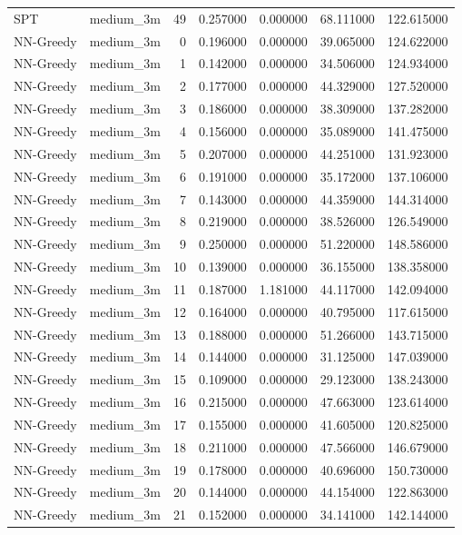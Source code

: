 \begin{tabular}{llrrrrr}
SPT & medium_3m & 49 & 0.257000 & 0.000000 & 68.111000 & 122.615000 \\
NN-Greedy & medium_3m & 0 & 0.196000 & 0.000000 & 39.065000 & 124.622000 \\
NN-Greedy & medium_3m & 1 & 0.142000 & 0.000000 & 34.506000 & 124.934000 \\
NN-Greedy & medium_3m & 2 & 0.177000 & 0.000000 & 44.329000 & 127.520000 \\
NN-Greedy & medium_3m & 3 & 0.186000 & 0.000000 & 38.309000 & 137.282000 \\
NN-Greedy & medium_3m & 4 & 0.156000 & 0.000000 & 35.089000 & 141.475000 \\
NN-Greedy & medium_3m & 5 & 0.207000 & 0.000000 & 44.251000 & 131.923000 \\
NN-Greedy & medium_3m & 6 & 0.191000 & 0.000000 & 35.172000 & 137.106000 \\
NN-Greedy & medium_3m & 7 & 0.143000 & 0.000000 & 44.359000 & 144.314000 \\
NN-Greedy & medium_3m & 8 & 0.219000 & 0.000000 & 38.526000 & 126.549000 \\
NN-Greedy & medium_3m & 9 & 0.250000 & 0.000000 & 51.220000 & 148.586000 \\
NN-Greedy & medium_3m & 10 & 0.139000 & 0.000000 & 36.155000 & 138.358000 \\
NN-Greedy & medium_3m & 11 & 0.187000 & 1.181000 & 44.117000 & 142.094000 \\
NN-Greedy & medium_3m & 12 & 0.164000 & 0.000000 & 40.795000 & 117.615000 \\
NN-Greedy & medium_3m & 13 & 0.188000 & 0.000000 & 51.266000 & 143.715000 \\
NN-Greedy & medium_3m & 14 & 0.144000 & 0.000000 & 31.125000 & 147.039000 \\
NN-Greedy & medium_3m & 15 & 0.109000 & 0.000000 & 29.123000 & 138.243000 \\
NN-Greedy & medium_3m & 16 & 0.215000 & 0.000000 & 47.663000 & 123.614000 \\
NN-Greedy & medium_3m & 17 & 0.155000 & 0.000000 & 41.605000 & 120.825000 \\
NN-Greedy & medium_3m & 18 & 0.211000 & 0.000000 & 47.566000 & 146.679000 \\
NN-Greedy & medium_3m & 19 & 0.178000 & 0.000000 & 40.696000 & 150.730000 \\
NN-Greedy & medium_3m & 20 & 0.144000 & 0.000000 & 44.154000 & 122.863000 \\
NN-Greedy & medium_3m & 21 & 0.152000 & 0.000000 & 34.141000 & 142.144000 \\

\end{tabular}
